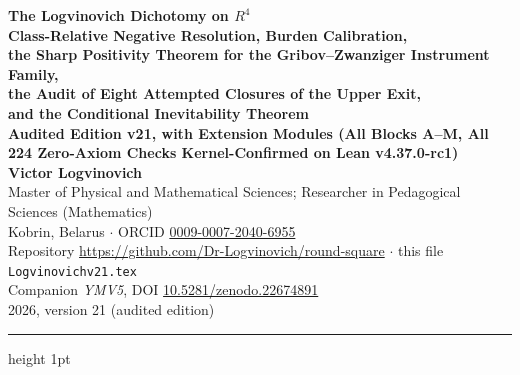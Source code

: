 \documentclass[11pt,a4paper]{article}
\def\R{R}\def\N{N}\def\Q{Q}\def\Z{Z}\def\Class{C}\def\OS{OS}\def\Gap{Gap}%
\theoremstyle{plain}
\theoremstyle{definition}
\theoremstyle{remark}
\newcommand{\R}{\mathbb{R}}\newcommand{\N}{\mathbb{N}}\newcommand{\Q}{\mathbb{Q}}
\newcommand{\Z}{\mathbb{Z}}\newcommand{\Spec}{\operatorname{Spec}}
\newcommand{\OS}{\mathrm{OS}}\newcommand{\Gap}{\mathrm{Gap}}
\newcommand{\Class}{\mathcal{C}}\newcommand{\Htot}{\mathcal{H}}
\renewcommand{\_}{\oldunderscore\allowbreak}
\begin{document}
\begin{center}
{\LARGE\bfseries\color{accentblue} The Logvinovich Dichotomy on $\R^4$}\\[8pt]
{\Large\bfseries Class-Relative Negative Resolution, Burden Calibration,\\
the Sharp Positivity Theorem for the Gribov--Zwanziger Instrument Family,\\
the Audit of Eight Attempted Closures of the Upper Exit,\\
and the Conditional Inevitability Theorem}\\[6pt]
{\large\bfseries Audited Edition v21, with Extension Modules (All Blocks A--M, All 224 Zero-Axiom Checks Kernel-Confirmed on Lean v4.37.0-rc1)}\\[8pt]
{\large\bfseries Victor Logvinovich}\\[2pt]
{\small Master of Physical and Mathematical Sciences; Researcher in Pedagogical Sciences (Mathematics)}\\
{\small Kobrin, Belarus $\cdot$ ORCID \href{https://orcid.org/0009-0007-2040-6955}{0009-0007-2040-6955}}\\[3pt]
{\small Repository \url{https://github.com/Dr-Logvinovich/round-square} $\cdot$ this file \texttt{Logvinovich\_v21.tex}}\\
{\small Companion \emph{YM\_V5}, DOI \href{https://doi.org/10.5281/zenodo.22674891}{10.5281/zenodo.22674891}}\\[4pt]
{\small 2026, version 21 (audited edition)}
\end{center}
\vspace{2pt}\hrule height 1pt\vspace{6pt}
\end{document}
